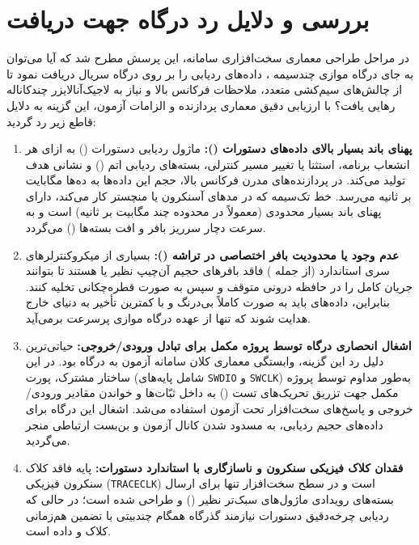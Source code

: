 \section{بررسی و دلایل رد درگاه  جهت دریافت }
\label{sec:rejection_of_swo}
در مراحل طراحی معماری سخت‌افزاری سامانه، این پرسش مطرح شد که آیا می‌توان به جای درگاه موازی چندسیمه ، داده‌های ردیابی را بر روی درگاه سریال  دریافت نمود تا از چالش‌های سیم‌کشی متعدد، ملاحظات فرکانس بالا و نیاز به لاجیک‌آنالایزر چندکاناله رهایی یافت؟ با ارزیابی دقیق معماری پردازنده و الزامات آزمون، این گزینه به دلایل قاطع زیر رد گردید:
\begin{enumerate}
    \item \textbf{پهنای باند بسیار بالای داده‌های  دستورات ():} ماژول ردیابی دستورات () به ازای هر انشعاب برنامه، استثنا یا تغییر مسیر کنترلی، بسته‌های ردیابی اتم () و نشانی هدف تولید می‌کند. در پردازنده‌های مدرن فرکانس بالا، حجم این داده‌ها به ده‌ها مگابایت بر ثانیه می‌رسد. خط تک‌سیمه  که در مدهای آسنکرون  یا منچستر کار می‌کند، دارای پهنای باند بسیار محدودی (معمولاً در محدوده چند مگابیت بر ثانیه) است و به سرعت دچار سرریز بافر و افت بسته‌ها () می‌گردد.
    \item \textbf{عدم وجود یا محدودیت بافر اختصاصی  در تراشه ():} بسیاری از میکروکنترلرهای سری استاندارد (از جمله ) فاقد بافرهای حجیم آن‌چیپ نظیر  یا  هستند تا بتوانند جریان کامل  را در حافظه درونی متوقف و سپس به صورت قطره‌چکانی تخلیه کنند. بنابراین، داده‌های  باید به صورت کاملاً بی‌درنگ و با کمترین تأخیر به دنیای خارج هدایت شوند که تنها از عهده درگاه موازی پرسرعت برمی‌آید.
    \item \textbf{اشغال انحصاری درگاه  توسط پروژه مکمل برای تبادل ورودی/خروجی:} حیاتی‌ترین دلیل رد این گزینه، وابستگی معماری کلان سامانه آزمون به درگاه  بود. در این ساختار مشترک، پورت  (شامل پایه‌های \texttt{SWDIO} و \texttt{SWCLK}) به‌طور مداوم توسط پروژه مکمل جهت تزریق تحریک‌های تست () به داخل ثبّات‌ها و خواندن مقادیر ورودی/خروجی و پاسخ‌های سخت‌افزار تحت آزمون استفاده می‌شد. اشغال این درگاه برای داده‌های حجیم ردیابی، به مسدود شدن کانال آزمون و بن‌بست ارتباطی منجر می‌گردید.
    \item \textbf{فقدان کلاک فیزیکی سنکرون و ناسازگاری با استاندارد  دستورات:} پایه  فاقد کلاک سنکرون فیزیکی (\texttt{TRACECLK}) است و در سطح سخت‌افزار تنها برای ارسال بسته‌های رویدادی ماژول‌های سبک‌تر نظیر  () و  طراحی شده است؛ در حالی که ردیابی چرخه‌دقیق دستورات نیازمند گذرگاه همگام چندبیتی  با تضمین هم‌زمانی کلاک و داده است.
\end{enumerate}


